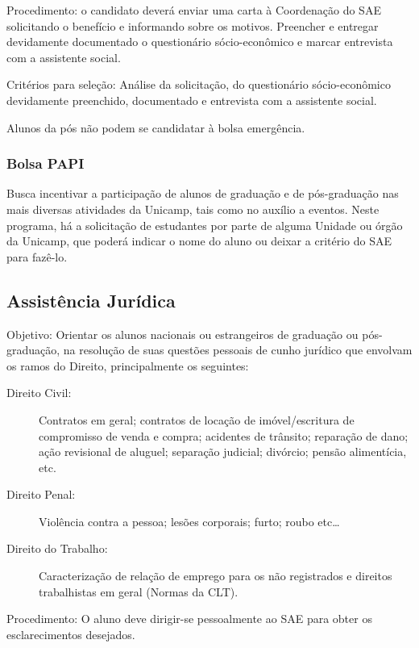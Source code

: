 Procedimento: o candidato deverá enviar uma carta à Coordenação do SAE
solicitando o benefício e informando sobre os motivos. Preencher e entregar
devidamente documentado o questionário sócio-econômico e marcar entrevista com a
assistente social.

Critérios para seleção: Análise da solicitação, do questionário sócio-econômico
devidamente preenchido, documentado e entrevista com a assistente social.

Alunos da pós não podem se candidatar à bolsa emergência.

\subsubsection*{Bolsa PAPI}

Busca incentivar a participação de alunos de graduação e de pós-graduação nas
mais diversas atividades da Unicamp, tais como no auxílio a eventos. Neste
programa, há a solicitação de estudantes por parte de alguma Unidade ou órgão da
Unicamp, que poderá indicar o nome do aluno ou deixar a critério do SAE para
fazê-lo.

\subsection{Assistência Jurídica}

Objetivo: Orientar os alunos nacionais ou estrangeiros de graduação ou
pós-graduação, na resolução de suas questões pessoais de cunho jurídico que
envolvam os ramos do Direito, principalmente os seguintes:

\begin{description}
    \item[Direito Civil:] Contratos em geral; contratos de locação de
        imóvel/escritura de compromisso de venda e compra; acidentes de
        trânsito; reparação de dano; ação revisional de aluguel; separação
        judicial; divórcio; pensão alimentícia, etc.

    \item[Direito Penal:] Violência contra a pessoa; lesões corporais; furto;
        roubo etc{\dots}

    \item[Direito do Trabalho:] Caracterização de relação de emprego para os não
        registrados e direitos trabalhistas em geral (Normas da CLT).
\end{description}

Procedimento: O aluno deve dirigir-se pessoalmente ao SAE para obter os
esclarecimentos desejados.

